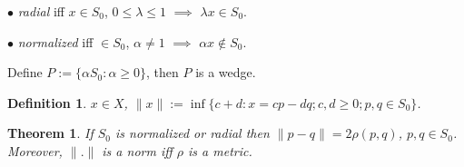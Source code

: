 \documentclass[12pt,letterpaper]{article}
\newtheorem{theorem}[lemma]{Theorem}
\newtheorem{definition}[lemma]{Definition}
\begin{document}
$\bullet$ \emph{radial} iff $x\in S_0$, $0\leq \lambda \leq 1$ $\implies$ $\lambda x\in S_0$.

$\bullet$ \emph{normalized} iff $\in S_0$, $\alpha \neq 1$ $\implies$ $\alpha x\notin S_0$.

Define $P:=\{ \alpha S_0: \alpha \geq 0\}$, then $P$ is a wedge.


\begin{definition}\label{de: basenorm} $x\in X$, $\|x\|:=\inf\{ c+d: x=cp-dq; c,d\geq 0; p,q\in S_0\}$.
\end{definition}

\begin{theorem}\label{thm:basenorm} If $S_0$ is normalized or radial then $\|p-q\|=2\rho(p,q)$, $p,q\in S_0$. Moreover, $\|.\|$ is a norm iff $\rho$ is a metric.
\end{theorem}
\end{document}
